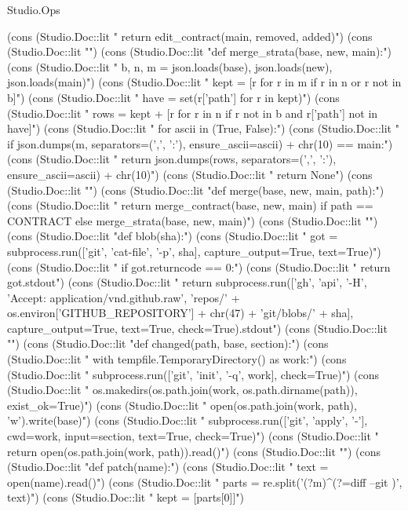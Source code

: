 \begin{lexlean}{Studio.Ops}
\begin{semanticmodule}
    (cons (Studio.Doc::lit "    return edit_contract(main, removed, added)\n")
    (cons (Studio.Doc::lit "\n")
    (cons (Studio.Doc::lit "def merge_strata(base, new, main):\n")
    (cons (Studio.Doc::lit "    b, n, m = json.loads(base), json.loads(new), json.loads(main)\n")
    (cons (Studio.Doc::lit "    kept = [r for r in m if r in n or r not in b]\n")
    (cons (Studio.Doc::lit "    have = set(r['path'] for r in kept)\n")
    (cons (Studio.Doc::lit "    rows = kept + [r for r in n if r not in b and r['path'] not in have]\n")
    (cons (Studio.Doc::lit "    for ascii in (True, False):\n")
    (cons (Studio.Doc::lit "        if json.dumps(m, separators=(',', ':'), ensure_ascii=ascii) + chr(10) == main:\n")
    (cons (Studio.Doc::lit "            return json.dumps(rows, separators=(',', ':'), ensure_ascii=ascii) + chr(10)\n")
    (cons (Studio.Doc::lit "    return None\n")
    (cons (Studio.Doc::lit "\n")
    (cons (Studio.Doc::lit "def merge(base, new, main, path):\n")
    (cons (Studio.Doc::lit "    return merge_contract(base, new, main) if path == CONTRACT else merge_strata(base, new, main)\n")
    (cons (Studio.Doc::lit "\n")
    (cons (Studio.Doc::lit "def blob(sha):\n")
    (cons (Studio.Doc::lit "    got = subprocess.run(['git', 'cat-file', '-p', sha], capture_output=True, text=True)\n")
    (cons (Studio.Doc::lit "    if got.returncode == 0:\n")
    (cons (Studio.Doc::lit "        return got.stdout\n")
    (cons (Studio.Doc::lit "    return subprocess.run(['gh', 'api', '-H', 'Accept: application/vnd.github.raw', 'repos/' + os.environ['GITHUB_REPOSITORY'] + chr(47) + 'git/blobs/' + sha], capture_output=True, text=True, check=True).stdout\n")
    (cons (Studio.Doc::lit "\n")
    (cons (Studio.Doc::lit "def changed(path, base, section):\n")
    (cons (Studio.Doc::lit "    with tempfile.TemporaryDirectory() as work:\n")
    (cons (Studio.Doc::lit "        subprocess.run(['git', 'init', '-q', work], check=True)\n")
    (cons (Studio.Doc::lit "        os.makedirs(os.path.join(work, os.path.dirname(path)), exist_ok=True)\n")
    (cons (Studio.Doc::lit "        open(os.path.join(work, path), 'w').write(base)\n")
    (cons (Studio.Doc::lit "        subprocess.run(['git', 'apply', '-'], cwd=work, input=section, text=True, check=True)\n")
    (cons (Studio.Doc::lit "        return open(os.path.join(work, path)).read()\n")
    (cons (Studio.Doc::lit "\n")
    (cons (Studio.Doc::lit "def patch(name):\n")
    (cons (Studio.Doc::lit "    text = open(name).read()\n")
    (cons (Studio.Doc::lit "    parts = re.split('(?m)^(?=diff --git )', text)\n")
    (cons (Studio.Doc::lit "    kept = [parts[0]]\n")

\end{semanticmodule}
\end{lexlean}
